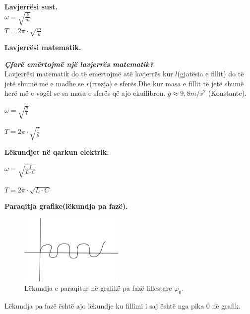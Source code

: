 \documentclass[twocolumn]{article}
\begin{document}
	
	
	\begin{center}
		\textbf{Lavjerrësi sust.}\\
		
		$\omega=\sqrt{\frac{k}{m}}$\\
		
		$T=2\pi \cdot \sqrt{\frac{m}{k}}$
		
	\end{center}
	
	\begin{center}
		\textbf{Lavjerrësi matematik.}
	\end{center}
	\begin{flushleft}
		
		\textbf{\textit{Çfarë emërtojmë një lavjerrës matematik?}}\\
		
		
		Lavjerrësi matematik do të emërtojmë atë lavjerrës kur $l$(gjatësia e fillit) do të jetë shumë më e madhe se $r$(rrezja) e sferës.Dhe kur masa e fillit të jetë shumë herë më e vogël se sa masa e sferës që ajo ekuilibron. $g \approx 9,8 m/s^2$ (Konstante).
	\end{flushleft}
	
	
	$\omega=\sqrt{\frac{g}{l}}$
	
	$T=2\pi \cdot \sqrt{\frac{l}{g}}$
	
	\begin{center}
		\textbf{Lëkundjet në qarkun elektrik.}
		
		
	\end{center}
	
	$\omega=\sqrt{\frac{I}{L \cdot C}}$
	
	$T=2 \pi \cdot \sqrt{L \cdot C}$
	\begin{center}
		\textbf{Paraqitja grafike(lëkundja pa fazë).}\\
	\end{center}
	
	\begin{figure}[h]
		\includegraphics[width=50mm]{Imazhet/lekundjet pa faz.png}
		\caption{Lëkundja e paraqitur në grafikë pa fazë fillestare $\varphi_0$.}
		\label{fig:boat1}
	\end{figure}
	Lëkundja pa fazë është ajo lëkundje ku fillimi i saj është nga pika 0 në grafik.\\
	
\end{document}
